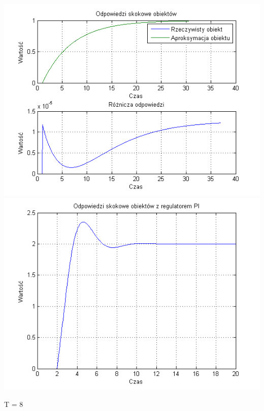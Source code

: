 \documentclass[10pt,a4paper]{article}
\begin{document}
\begin{center}
\includegraphics[scale=1]{images/jeden/skrypt_25.png}\\
\includegraphics[scale=1]{images/jeden/skrypt_26.png}\\
\end{center}
\newpage
T = 8
\end{document}
